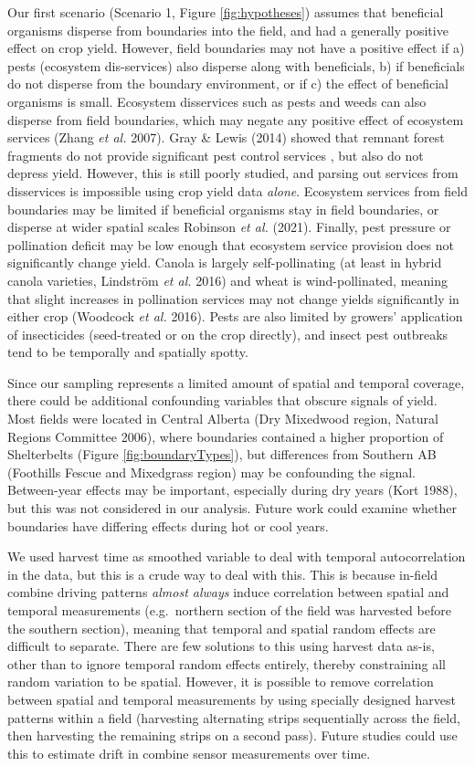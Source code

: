 \documentclass[]{elsarticle} %
\begin{document}
Our first scenario (Scenario 1, Figure \ref{fig:hypotheses}) assumes that beneficial organisms disperse from boundaries into the field, and had a generally positive effect on crop yield.
However, field boundaries may not have a positive effect if a) pests (ecosystem dis-services) also disperse along with beneficials, b) if beneficials do not disperse from the boundary environment, or if c) the effect of beneficial organisms is small.
Ecosystem disservices such as pests and weeds can also disperse from field boundaries, which may negate any positive effect of ecosystem services (Zhang \emph{et al.} 2007).
Gray \& Lewis (2014) showed that remnant forest fragments do not provide significant pest control services , but also do not depress yield.
However, this is still poorly studied, and parsing out services from disservices is impossible using crop yield data \emph{alone}.
Ecosystem services from field boundaries may be limited if beneficial organisms stay in field boundaries, or disperse at wider spatial scales Robinson \emph{et al.} (2021).
Finally, pest pressure or pollination deficit may be low enough that ecosystem service provision does not significantly change yield.
Canola is largely self-pollinating (at least in hybrid canola varieties, Lindström \emph{et al.} 2016) and wheat is wind-pollinated, meaning that slight increases in pollination services may not change yields significantly in either crop (Woodcock \emph{et al.} 2016).
Pests are also limited by growers' application of insecticides (seed-treated or on the crop directly), and insect pest outbreaks tend to be temporally and spatially spotty.

Since our sampling represents a limited amount of spatial and temporal coverage, there could be additional confounding variables that obscure signals of yield.
Most fields were located in Central Alberta (Dry Mixedwood region, Natural Regions Committee 2006), where boundaries contained a higher proportion of Shelterbelts (Figure \ref{fig:boundaryTypes}), but differences from Southern AB (Foothills Fescue and Mixedgrass region) may be confounding the signal.
Between-year effects may be important, especially during dry years (Kort 1988), but this was not considered in our analysis.
Future work could examine whether boundaries have differing effects during hot or cool years.

We used harvest time as smoothed variable to deal with temporal autocorrelation in the data, but this is a crude way to deal with this.
This is because in-field combine driving patterns \emph{almost always} induce correlation between spatial and temporal measurements (e.g.~northern section of the field was harvested before the southern section), meaning that temporal and spatial random effects are difficult to separate.
There are few solutions to this using harvest data as-is, other than to ignore temporal random effects entirely, thereby constraining all random variation to be spatial.
However, it is possible to remove correlation between spatial and temporal measurements by using specially designed harvest patterns within a field (harvesting alternating strips sequentially across the field, then harvesting the remaining strips on a second pass).
Future studies could use this to estimate drift in combine sensor measurements over time.
\end{document}
